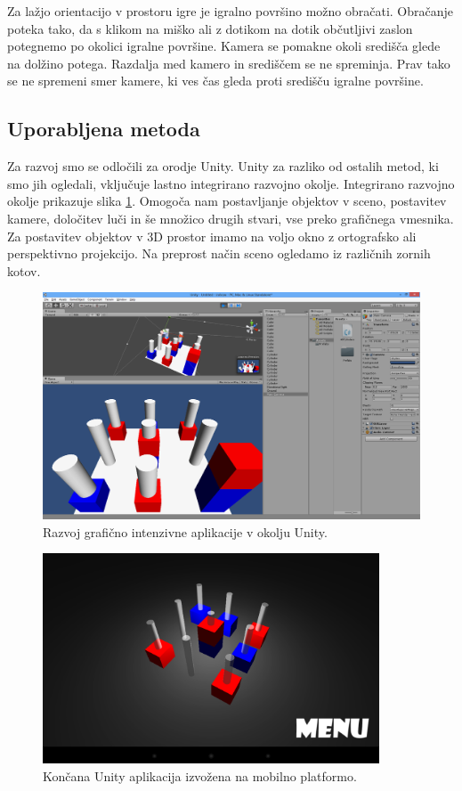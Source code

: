 Za lažjo orientacijo v prostoru igre je igralno površino možno obračati. Obračanje poteka tako, da s klikom na miško ali z dotikom na dotik občutljivi zaslon potegnemo po okolici igralne površine. Kamera se pomakne okoli središča glede na dolžino potega. Razdalja med kamero in središčem se ne spreminja. Prav tako se ne spremeni smer kamere, ki ves čas gleda proti središču igralne površine.

\subsection{Uporabljena metoda}

Za razvoj smo se odločili za orodje Unity. Unity za razliko od ostalih metod, ki smo  jih ogledali, vključuje lastno integrirano razvojno okolje. Integrirano razvojno okolje prikazuje slika \ref{mineditor}. Omogoča nam postavljanje objektov v sceno, postavitev kamere, določitev luči in še množico drugih stvari, vse preko grafičnega vmesnika. Za postavitev objektov v 3D prostor imamo na voljo okno z ortografsko ali perspektivno projekcijo. Na preprost način sceno ogledamo iz različnih zornih kotov.


\begin{figure}
\begin{center}
\includegraphics[width=12cm]{pic/min-editor.png}
\end{center}
\caption{Razvoj grafično intenzivne aplikacije v okolju Unity.}
\label{mineditor}
\end{figure} 

\begin{figure}
\begin{center}
\includegraphics[width=10cm]{pic/min-play.png}
\end{center}
\caption{Končana Unity aplikacija izvožena na mobilno platformo.}
\label{minplay}
\end{figure} 

